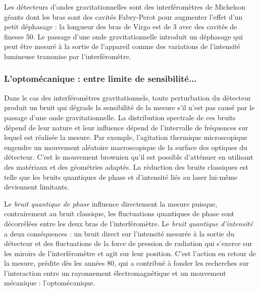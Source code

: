 \documentclass[12pt,a4paper]{article}
\begin{document}
Les détecteurs d'ondes gravitationnelles sont des interféromètres de Michelson géants dont les bras sont des cavités Fabry-Perot pour augmenter l'effet d'un petit déphasage : la longueur des bras de Virgo est de \unit{3}{\kilo\meter} avec des cavités de finesse 50.
Le passage d'une onde gravitationnelle introduit un déphasage qui peut être mesuré à la sortie de l'appareil comme des variations de l'intensité lumineuse transmise par l'interféromètre.

\subsubsection{L'optomécanique : entre limite de sensibilité...}

Dans le cas des interféromètres gravitationnels, toute perturbation du détecteur produit un bruit qui dégrade la sensibilité de la mesure s'il n'est pas causé par le passage d'une onde gravitationnelle.
La distribution spectrale de ces bruits dépend de leur nature et leur influence dépend de l'intervalle de fréquences sur lequel est réalisée la mesure.
Par exemple, l'agitation thermique microscopique engendre un mouvement aléatoire macroscopique de la surface des optiques du détecteur.
C'est le mouvement brownien qu'il est possible d'atténuer en utilisant des matériaux et des géométries adaptés.
La réduction des bruits classiques est telle que les bruits quantiques de phase et d'intensité liés au laser lui-même deviennent limitants.

Le \textit{bruit quantique de phase} influence directement la mesure puisque, contrairement au bruit classique, les fluctuations quantiques de phase sont décorrélées entre les deux bras de l'interféromètre.
Le \textit{bruit quantique d'intensité} a deux conséquences : un bruit direct sur l'intensité mesurée à la sortie du détecteur et des fluctuations de la force de pression de radiation qui s'exerce sur les miroirs de l'interféromètre et agit sur leur position.
C'est l'action en retour de la mesure, prédite dès les années 80, qui a contribué à fonder les recherches sur l'interaction entre un rayonnement électromagnétique et un mouvement mécanique : l'optomécanique.
\end{document}
